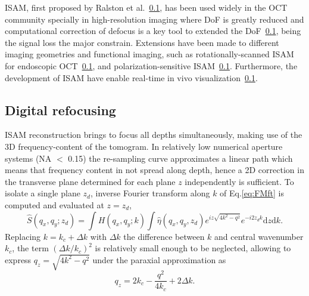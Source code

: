 ISAM, first proposed by Ralston et al.~\ref{}, has been used widely in the OCT community specially in high-resolution imaging where DoF is greatly reduced and computational correction of defocus is a key tool to extended the DoF~\ref{}, being the signal loss the major constrain. Extensions have been made to different imaging geometries and functional imaging, such as rotationally-scanned ISAM for endoscopic OCT~\ref{}, and polarization-sensitive ISAM~\ref{}. Furthermore, the development of ISAM have enable real-time in vivo visualization~\ref{}. 

\subsection{Digital refocusing}

ISAM reconstruction brings to focus all depths simultaneously, making use of the 3D frequency-content of the tomogram. In relatively low numerical aperture systems (NA $<$ 0.15) the re-sampling curve approximates a linear path which means that frequency content in not spread along depth, hence a 2D correction in the transverse plane determined for each plane $z$ independently is sufficient. To isolate a single plane $z_d$, inverse Fourier transform along $k$ of Eq.\eqref{eq:FMft} is computed and evaluated at $z=z_d$,
\begin{equation}\label{eq:preDefocus}
    \hat{S}(q_x,q_y; z_d) = \int H(q_x, q_y; k) \int \hat{\eta}(q_x,q_y, z_d) e^{iz\sqrt{4k^2-q^2}} e^{-i2z_dk} \text{d}z\text{d}k.
\end{equation}
Replacing $k=k_c + \Delta k$ with $\Delta k$ the difference between $k$ and central wavenumber $k_c$, the term $(\Delta k/k_c)^2$ is relatively small enough to be neglected, allowing to express $q_z=\sqrt{4k^2-q^2}$ under the paraxial approximation as
\begin{equation}\label{eq:qzAprox}
    q_z = 2k_c - \frac{q^2}{4k_c} + 2\Delta k.
\end{equation}

